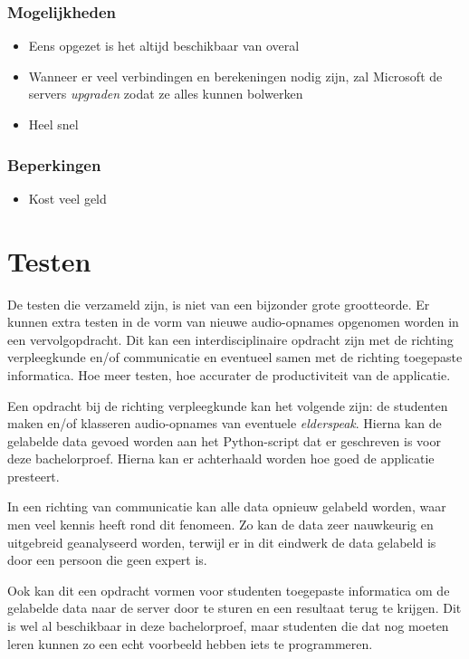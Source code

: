 \subsubsection{Mogelijkheden}
\begin{itemize}
    \item Eens opgezet is het altijd beschikbaar van overal
    \item Wanneer er veel verbindingen en berekeningen nodig zijn, zal Microsoft de servers \textit{upgraden} zodat ze alles kunnen bolwerken
    \item Heel snel
\end{itemize}
\subsubsection{Beperkingen}
\begin{itemize}
    \item Kost veel geld
\end{itemize}
\section{Testen}
De testen die verzameld zijn, is niet van een bijzonder grote grootteorde. Er kunnen extra testen in de vorm van nieuwe audio-opnames opgenomen worden in een vervolgopdracht. Dit kan een interdisciplinaire opdracht zijn met de richting verpleegkunde en/of communicatie en eventueel samen met de richting toegepaste informatica. Hoe meer testen, hoe accurater de productiviteit van de applicatie.

Een opdracht bij de richting verpleegkunde kan het volgende zijn: de studenten maken en/of klasseren audio-opnames van eventuele \textit{elderspeak}. Hierna kan de gelabelde data gevoed worden aan het Python-script dat er geschreven is voor deze bachelorproef. Hierna kan er achterhaald worden hoe goed de applicatie presteert.

In een richting van communicatie kan alle data opnieuw gelabeld worden, waar men veel kennis heeft rond dit fenomeen. Zo kan de data zeer nauwkeurig en uitgebreid geanalyseerd worden, terwijl er in dit eindwerk de data gelabeld is door een persoon die geen expert is.

Ook kan dit een opdracht vormen voor studenten toegepaste informatica om de gelabelde data naar de server door te sturen en een resultaat terug te krijgen. Dit is wel al beschikbaar in deze bachelorproef, maar studenten die dat nog moeten leren kunnen zo een echt voorbeeld hebben iets te programmeren.
